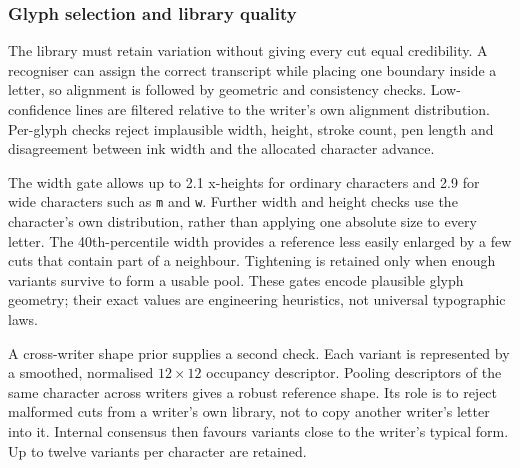 \subsubsection{Glyph selection and library quality}
The library must retain variation without giving every cut equal credibility. A recogniser can assign the correct transcript while placing one boundary inside a letter, so alignment is followed by geometric and consistency checks. Low-confidence lines are filtered relative to the writer's own alignment distribution. Per-glyph checks reject implausible width, height, stroke count, pen length and disagreement between ink width and the allocated character advance.

The width gate allows up to 2.1 x-heights for ordinary characters and 2.9 for wide characters such as \texttt{m} and \texttt{w}. Further width and height checks use the character's own distribution, rather than applying one absolute size to every letter. The 40th-percentile width provides a reference less easily enlarged by a few cuts that contain part of a neighbour. Tightening is retained only when enough variants survive to form a usable pool. These gates encode plausible glyph geometry; their exact values are engineering heuristics, not universal typographic laws.

A cross-writer shape prior supplies a second check. Each variant is represented by a smoothed, normalised $12\times12$ occupancy descriptor. Pooling descriptors of the same character across writers gives a robust reference shape. Its role is to reject malformed cuts from a writer's own library, not to copy another writer's letter into it. Internal consensus then favours variants close to the writer's typical form. Up to twelve variants per character are retained.

